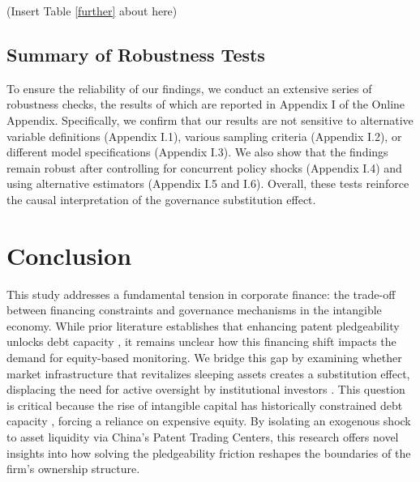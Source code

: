 \documentclass[12pt,a4paper]{article}
\begin{document}
\begin{center}
    (Insert Table \ref{further} about here)
\end{center}

\subsection{Summary of Robustness Tests}
To ensure the reliability of our findings, we conduct an extensive series of robustness checks, the results of which are reported in Appendix I of the Online Appendix. Specifically, we confirm that our results are not sensitive to alternative variable definitions (Appendix I.1), various sampling criteria (Appendix I.2), or different model specifications (Appendix I.3). We also show that the findings remain robust after controlling for concurrent policy shocks (Appendix I.4) and using alternative estimators (Appendix I.5 and I.6). Overall, these tests reinforce the causal interpretation of the governance substitution effect.

\section{Conclusion}\label{sec6}
This study addresses a fundamental tension in corporate finance: the trade-off between financing constraints and governance mechanisms in the intangible economy. While prior literature establishes that enhancing patent pledgeability unlocks debt capacity \citep{mann2018creditor,hochberg2018patent}, it remains unclear how this financing shift impacts the demand for equity-based monitoring. We bridge this gap by examining whether market infrastructure that revitalizes sleeping assets creates a substitution effect, displacing the need for active oversight by institutional investors \citep{appel2019standing}. This question is critical because the rise of intangible capital has historically constrained debt capacity \citep{falato2022rising}, forcing a reliance on expensive equity. By isolating an exogenous shock to asset liquidity via China's Patent Trading Centers, this research offers novel insights into how solving the pledgeability friction reshapes the boundaries of the firm’s ownership structure.
\end{document}
